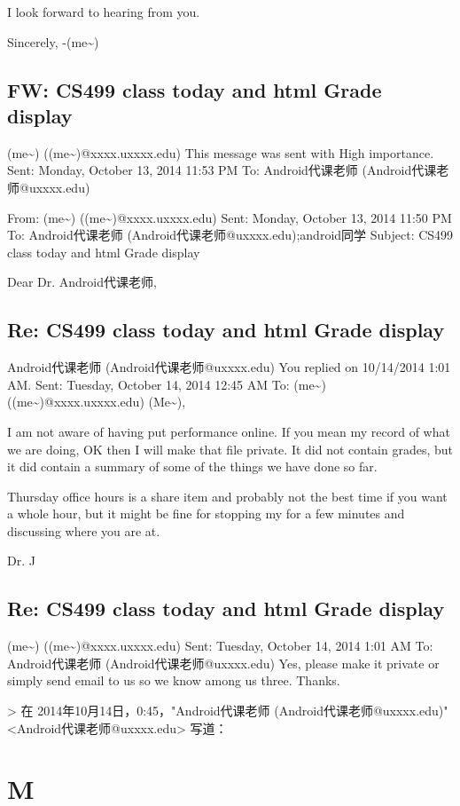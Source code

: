 \documentclass[12pt]{book}
\begin{document}
I look forward to hearing from you. 

Sincerely,
-(me\textasciitilde{})
\section{FW: CS499 class today and html Grade display}
\label{sec-14-6}
(me\textasciitilde{}) ((me\textasciitilde{})@xxxx.uxxxx.edu)
This message was sent with High importance.
Sent:        Monday, October 13, 2014 11:53 PM
To:        
Android代课老师 (Android代课老师@uxxxx.edu)

From: (me\textasciitilde{}) ((me\textasciitilde{})@xxxx.uxxxx.edu)
Sent: Monday, October 13, 2014 11:50 PM
To: Android代课老师 (Android代课老师@uxxxx.edu);android同学
Subject: CS499 class today and html Grade display

Dear Dr. Android代课老师,
\section{Re: CS499 class today and html Grade display}
\label{sec-14-7}
Android代课老师 (Android代课老师@uxxxx.edu)
You replied on 10/14/2014 1:01 AM.
Sent:        Tuesday, October 14, 2014 12:45 AM
To:        
(me\textasciitilde{}) ((me\textasciitilde{})@xxxx.uxxxx.edu)
(Me\textasciitilde{}),

I am not aware of having put performance online.  If you mean my record of what we are doing, OK then I will make that file private. It did not contain grades, but it did contain a summary of some of the things we have done so far.

Thursday office hours is a share item and probably not the best time if you want a whole hour, but it might be fine for stopping my for a few minutes and discussing where you are at.

Dr. J

\section{Re: CS499 class today and html Grade display}
\label{sec-14-8}
(me\textasciitilde{}) ((me\textasciitilde{})@xxxx.uxxxx.edu)
Sent:        Tuesday, October 14, 2014 1:01 AM
To:        
Android代课老师 (Android代课老师@uxxxx.edu)
Yes, please make it private or simply send email to us so we know among us three. Thanks.

> 在 2014年10月14日，0:45，"Android代课老师 (Android代课老师@uxxxx.edu)" <Android代课老师@uxxxx.edu> 写道：

\chapter{M}
\label{sec-15}
\end{document}
